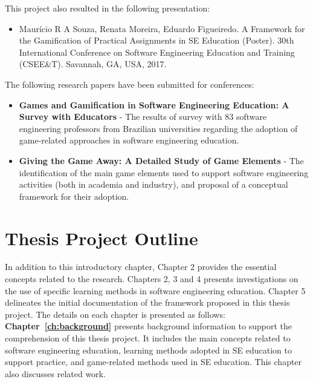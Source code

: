 This project also resulted in the following presentation:

\begin{itemize}
    \item Maurício R A Souza, Renata Moreira, Eduardo Figueiredo. A Framework for the Gamification of Practical Assignments in SE Education (Poster). 30th International Conference on Software Engineering Education and Training (CSEE\&T). Savannah, GA, USA, 2017.
\end{itemize}

The following research papers have been submitted for conferences:

\begin{itemize}
    \item \textbf{Games and Gamification in Software Engineering Education: A Survey with Educators} - The results of survey with 83 software engineering professors from Brazilian universities regarding the adoption of game-related approaches in software engineering education.
    \item \textbf{Giving the Game Away: A Detailed Study of Game Elements} - The identification of the main game elements used to support software engineering activities (both in academia and industry), and proposal of a conceptual framework for their adoption.
    
\end{itemize}

\section{Thesis Project Outline}
\label{sec:outline}

In addition to this introductory chapter, Chapter 2 provides the essential concepts related to the research. Chapters 2, 3 and 4 presents investigations on the use of specific learning methods in software engineering education. Chapter 5 delineates the initial documentation of the framework proposed in this thesis project. The details on each chapter is presented as follows:\\

\noindent
\textbf{Chapter~\ref{ch:background}} presents background information to support the comprehension of this thesis project. It includes the main concepts related to software engineering education, learning methods adopted in SE education to support practice, and game-related methods used in SE education. This chapter also discusses related work.\\

